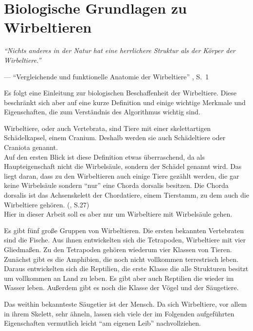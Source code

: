 \chapter{Biologische Grundlagen zu Wirbeltieren}

\begin{center}
 \begin{minipage}{12cm}
  \emph{"`Nichts anderes in der Natur hat eine herrlichere Struktur als der Körper der Wirbeltiere."'}
 
  --- "`Vergleichende und funktionelle Anatomie der Wirbeltiere"' \cite{Vergleichende_Anatomie}, S.\ 1
 \end{minipage}
\end{center}

Es folgt eine Einleitung zur biologischen Beschaffenheit der Wirbeltiere. Diese beschränkt sich aber auf eine kurze Definition und einige wichtige Merkmale und Eigenschaften, die zum Verständnis des Algorithmus wichtig sind.

Wirbeltiere, oder auch Vertebrata, sind Tiere mit einer skelettartigen Schädelkapsel, einem Cranium. Deshalb werden sie auch Schädeltiere oder Craniota genannt.\\
Auf den ersten Blick ist diese Definition etwas überraschend, da als  Haupteigenschaft nicht die Wirbelsäule, sondern der Schädel genannt wird. Das liegt daran, dass zu den Wirbeltieren auch einige Tiere gezählt werden, die gar keine Wirbelsäule sondern "`nur"' eine Chorda dorsalis besitzen. Die Chorda dorsalis ist das Achsenskelett der Chordatiere, einem Tierstamm, zu dem auch die Wirbeltiere gehören. (\cite{Vergleichende_Anatomie}, S.27)\\ %
Hier in dieser Arbeit soll es aber nur um Wirbeltiere mit Wirbelsäule gehen.

Es gibt fünf große Gruppen von Wirbeltieren. Die ersten bekannten Vertebraten sind die Fische. Aus ihnen entwickelten sich die Tetrapoden, Wirbeltiere mit vier Gliedmaßen. Zu den Tetrapoden gehören wiederum vier Klassen von Tieren. Zunächst gibt es die Amphibien, die noch nicht vollkommen terrestrisch leben. Daraus entwickelten sich die Reptilien, die erste Klasse die alle Strukturen besitzt um vollkommen an Land zu leben. Es gibt aber auch Reptilien die wieder im Wasser leben. Außerdem gibt es noch die Klasse der Vögel und der Säugetiere.

Das weithin bekannteste Säugetier ist der Mensch. Da sich Wirbeltiere, vor allem in ihrem Skelett, sehr ähneln, lassen sich viele der im Folgenden aufgeführten Eigenschaften vermutlich leicht "`am eigenen Leib"' nachvollziehen.


